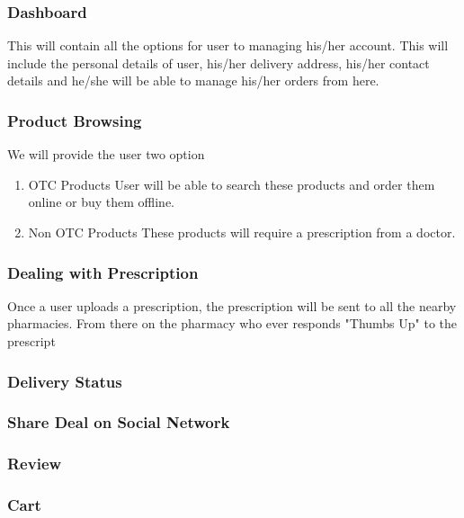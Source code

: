\documentclass[fleqn,10pt]{../SelfArx} %
\begin{document}
\subsubsection{Dashboard}
This will contain all the options for user to managing his/her account. This will include the personal details of user, his/her delivery address, his/her contact details and he/she will be able to manage his/her orders from here.
\subsubsection{Product Browsing}
We will provide the user two option
\begin{enumerate}
\item {OTC Products}
User will be able to search these products and order them online or buy them offline.
\item {Non OTC Products}
These products will require a prescription from a doctor.
\end{enumerate}

\subsubsection{Dealing with Prescription}
Once a user uploads a prescription, the prescription will be sent to all the nearby pharmacies. From there on the pharmacy who ever responds "Thumbs Up" to the prescript
\subsubsection{Delivery Status}


\subsubsection{Share Deal on Social Network}
\subsubsection{Review}
\subsubsection{Cart}
\end{document}
